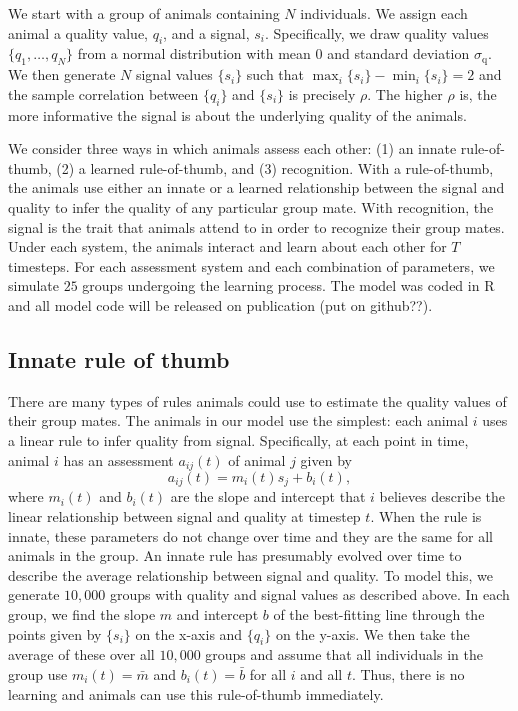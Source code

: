 We start with a group of animals containing $N$ individuals. We assign each animal a quality value, $q_i$, and a signal, $s_i$. Specifically, we draw quality values $\{q_1,\dots,q_N\}$ from a normal distribution with mean $0$ and standard deviation $\sigma_\text{q}$. We then generate $N$ signal values $\{s_i\}$ such that 
$\max_i\{s_i\}-\min_i\{s_i\}=2$ and the sample correlation between $\{q_i\}$ and $\{s_i\}$ is precisely $\rho$. 
The higher $\rho$ is, the more informative the signal is about the underlying quality of the animals.

We consider three ways in which animals assess each other: (1) an innate rule-of-thumb, (2) a learned rule-of-thumb, and (3) recognition. With a rule-of-thumb, the animals use either an innate or a learned relationship between the signal and quality to infer the quality of any particular group mate. With recognition, the signal is the trait that animals attend to in order to recognize their group mates. Under each system, the animals interact and learn about each other for $T$ timesteps. For each assessment system and each combination of parameters, we simulate $25$ groups undergoing the learning process. The model was coded in R and all model code will be released on publication (put on github??).

\subsection*{Innate rule of thumb}
There are many types of rules animals could use to estimate the quality values of their group mates. The animals in our model use the simplest: each animal $i$ uses a linear rule to infer quality from signal. Specifically, at each point in time, animal $i$ has an assessment $a_{ij}(t)$ of animal $j$ given by 
\begin{equation*}
a_{ij}(t)=m_i(t)s_j+b_i(t),
\end{equation*}
where $m_i(t)$ and $b_i(t)$ are the slope and intercept that $i$ believes describe the linear relationship between signal and quality at timestep $t$. When the rule is innate, these parameters do not change over time and they are the same for all animals in the group. An innate rule has presumably evolved over time to describe the average relationship between signal and quality. To model this, we generate $10,000$ groups with quality and signal values as described above. In each group, we find the slope $m$ and intercept $b$ of the best-fitting line through the points given by $\{s_i\}$ on the x-axis and $\{q_i\}$ on the y-axis. We then take the average of these over all $10,000$ groups and assume that all individuals in the group use $m_i(t)=\bar{m}$ and $b_i(t)=\bar{b}$ for all $i$ and all $t$. Thus, there is no learning and animals can use this rule-of-thumb immediately. 

